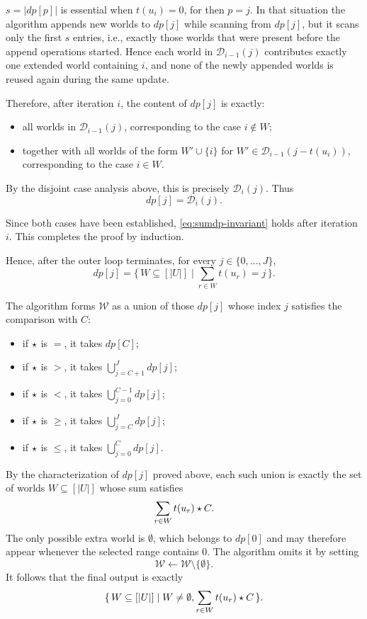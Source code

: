 \begin{appendixproof}
$s=|dp[p]|$ is essential when $t(u_i)=0$, for then $p=j$.
In that situation the algorithm appends new worlds to $dp[j]$ while scanning from $dp[j]$, but it scans only the first $s$ entries, i.e., exactly those worlds that were present before the append operations started.
Hence each world in $\mathcal D_{i-1}(j)$ contributes exactly one extended world containing $i$, and none of the newly appended worlds is reused again during the same update.

Therefore, after iteration $i$, the content of $dp[j]$ is exactly:
\begin{itemize}
\item all worlds in $\mathcal D_{i-1}(j)$, corresponding to the case $i\notin W$;
\item together with all worlds of the form $W'\cup\{i\}$ for
  $W'\in\mathcal D_{i-1}(j-t(u_i))$, corresponding to the case $i\in W$.
\end{itemize}
By the disjoint case analysis above, this is precisely $\mathcal D_i(j)$.
Thus
\[
dp[j]=\mathcal D_i(j).
\]

Since both cases have been established, \eqref{eq:sumdp-invariant} holds after iteration $i$.
This completes the proof by induction.

Hence, after the outer loop terminates, for every $j\in\{0,\dots,J\}$,
\[
dp[j]
=
\{\,W\subseteq [|U|]\mid \sum_{r\in W}t(u_r)=j\,\}.
\]

The algorithm forms $\mathcal W$ as a union of those $dp[j]$ whose index $j$ satisfies the comparison with $C$:
\begin{itemize}
\item if $\mathbin{\mathsf{\star}}$ is $=$, it takes $dp[C]$;
\item if $\mathbin{\mathsf{\star}}$ is $>$, it takes $\bigcup_{j=C+1}^{J} dp[j]$;
\item if $\mathbin{\mathsf{\star}}$ is $<$, it takes $\bigcup_{j=0}^{C-1} dp[j]$;
\item if $\mathbin{\mathsf{\star}}$ is $\ge$, it takes $\bigcup_{j=C}^{J} dp[j]$;
\item if $\mathbin{\mathsf{\star}}$ is $\le$, it takes $\bigcup_{j=0}^{C} dp[j]$.
\end{itemize}
By the characterization of $dp[j]$ proved above, each such union is exactly the set of worlds
$W\subseteq [|U|]$ whose sum satisfies
\[
  \sum_{r\in W} t(u_r)\mathbin{\mathsf{\star}} C.
\]
The only possible extra world is $\emptyset$, which belongs to $dp[0]$ and may therefore appear whenever the selected range contains $0$.
The algorithm omits it by setting
\[
\mathcal W\gets \mathcal W\setminus \{\emptyset\}.
\]
It follows that the final output is exactly
\[
  \{\,W\subseteq [|U|]\mid W\neq\emptyset,\sum_{r\in W} t(u_r)\mathbin{\mathsf{\star}} C\,\}.
\]


\end{appendixproof}
